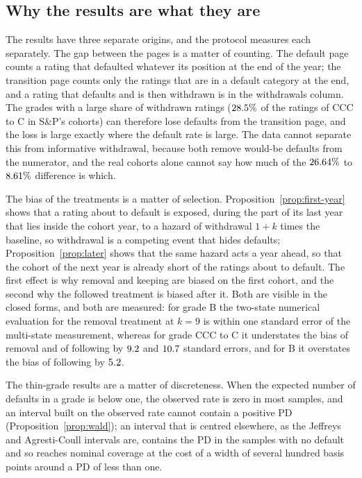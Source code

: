 \subsection{Why the results are what they are}
\label{sec:discussion-why}

The results have three separate origins, and the protocol measures each separately. The gap between the pages is a matter of counting. The default page counts a rating that defaulted whatever its position at the end of the year; the transition page counts only the ratings that are in a default category at the end, and a rating that defaults and is then withdrawn is in the withdrawals column. The grades with a large share of withdrawn ratings ($28.5\%$ of the ratings of CCC to C in S\&P's cohorts) can therefore lose defaults from the transition page, and the loss is large exactly where the default rate is large. The data cannot separate this from informative withdrawal, because both remove would-be defaults from the numerator, and the real cohorts alone cannot say how much of the $26.64\%$ to $8.61\%$ difference is which. %

The bias of the treatments is a matter of selection. Proposition~\ref{prop:first-year} shows that a rating about to default is exposed, during the part of its last year that lies inside the cohort year, to a hazard of withdrawal $1+k$ times the baseline, so withdrawal is a competing event that hides defaults; Proposition~\ref{prop:later} shows that the same hazard acts a year ahead, so that the cohort of the next year is already short of the ratings about to default. The first effect is why removal and keeping are biased on the first cohort, and the second why the followed treatment is biased after it. Both are visible in the closed forms, and both are measured: for grade B the two-state numerical evaluation for the removal treatment at $k=9$ is within one standard error of the multi-state measurement, whereas for grade CCC to C it understates the bias of removal and of following by $9.2$ and $10.7$ standard errors, and for B it overstates the bias of following by $5.2$.

The thin-grade results are a matter of discreteness. When the expected number of defaults in a grade is below one, the observed rate is zero in most samples, and an interval built on the observed rate cannot contain a positive PD (Proposition~\ref{prop:wald}); an interval that is centred elsewhere, as the Jeffreys and Agresti-Coull intervals are, contains the PD in the samples with no default and so reaches nominal coverage at the cost of a width of several hundred basis points around a PD of less than one.

